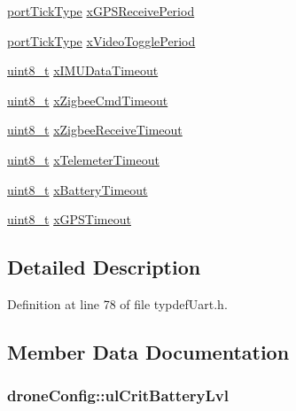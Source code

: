 \begin{DoxyCompactItemize}
\hyperlink{typdefUart_8h_ae9fa5e001303f1be1c0294f26cde8caf}{port\-Tick\-Type} \hyperlink{structdroneConfig_ae0b978b5906545132a1a1a37c3ca4907}{x\-G\-P\-S\-Receive\-Period}
\item 
\hyperlink{typdefUart_8h_ae9fa5e001303f1be1c0294f26cde8caf}{port\-Tick\-Type} \hyperlink{structdroneConfig_a7035d86cd38b594b1dbb98a80620ed22}{x\-Video\-Toggle\-Period}
\item 
\hyperlink{typdefUart_8h_aba7bc1797add20fe3efdf37ced1182c5}{uint8\-\_\-t} \hyperlink{structdroneConfig_a9abfb72bb174ea001aa9cbe0e196fac7}{x\-I\-M\-U\-Data\-Timeout}
\item 
\hyperlink{typdefUart_8h_aba7bc1797add20fe3efdf37ced1182c5}{uint8\-\_\-t} \hyperlink{structdroneConfig_a2eee39829fa6406904f2853658554814}{x\-Zigbee\-Cmd\-Timeout}
\item 
\hyperlink{typdefUart_8h_aba7bc1797add20fe3efdf37ced1182c5}{uint8\-\_\-t} \hyperlink{structdroneConfig_a5708172eb0cdfd665ee9ba776168faa1}{x\-Zigbee\-Receive\-Timeout}
\item 
\hyperlink{typdefUart_8h_aba7bc1797add20fe3efdf37ced1182c5}{uint8\-\_\-t} \hyperlink{structdroneConfig_aa191e8867f3a6277d18a0f4379affb1b}{x\-Telemeter\-Timeout}
\item 
\hyperlink{typdefUart_8h_aba7bc1797add20fe3efdf37ced1182c5}{uint8\-\_\-t} \hyperlink{structdroneConfig_a30a59cf24e01d514b6d72c86deb1f02e}{x\-Battery\-Timeout}
\item 
\hyperlink{typdefUart_8h_aba7bc1797add20fe3efdf37ced1182c5}{uint8\-\_\-t} \hyperlink{structdroneConfig_ae272c4dd5a556fe40d2ea3105bf0aa96}{x\-G\-P\-S\-Timeout}
\end{DoxyCompactItemize}


\subsection{Detailed Description}


Definition at line 78 of file typdef\-Uart.\-h.



\subsection{Member Data Documentation}
\hypertarget{structdroneConfig_a4ec612c83c80eba7815c541307c9f619}{
\subsubsection[{ul\-Crit\-Battery\-Lvl}]{ drone\-Config\-::ul\-Crit\-Battery\-Lvl}}\label{structdroneConfig_a4ec612c83c80eba7815c541307c9f619}



